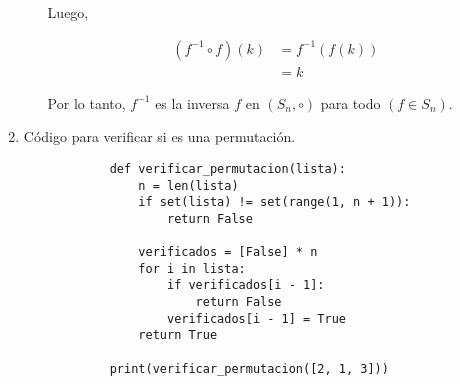 \documentclass{report}
\begin{document}
\begin{enumerate}
\begin{enumerate}
            Luego,

            \begin{align*}
            (f^{-1} \circ f)(k) &= f^{-1}(f(k)) \\
            &= k
            \end{align*}

            Por lo tanto, $f^{-1}$ es la inversa $f$ en $(S_n, \circ)$ para todo $(f \in S_n)$.
        \end{enumerate}

        \item Código para verificar si es una permutación.
        \begin{verbatim}
            def verificar_permutacion(lista):
                n = len(lista)
                if set(lista) != set(range(1, n + 1)):
                    return False
            
                verificados = [False] * n
                for i in lista:
                    if verificados[i - 1]:
                        return False
                    verificados[i - 1] = True
                return True
            
            print(verificar_permutacion([2, 1, 3]))
        \end{verbatim}
    \end{enumerate}
\end{document}
